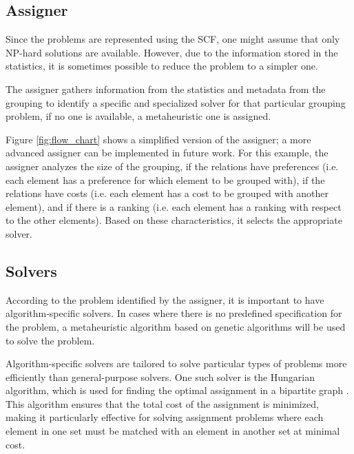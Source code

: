     

    \subsection{Assigner}
        Since the problems are represented using the SCF, one might assume that only NP-hard solutions are available. However, due to the information stored in the statistics, it is sometimes possible to reduce the problem to a simpler one.

        The assigner gathers information from the statistics and metadata from the grouping to identify a specific and specialized solver for that particular grouping problem, if no one is available, a metaheuristic one is assigned.

        Figure \ref{fig:flow_chart} shows a simplified version of the assigner; a more advanced assigner can be implemented in future work.
        For this example, the assigner analyzes the size of the grouping, if the relations have preferences (i.e. each element has a preference for which element to be grouped with), if the relations have costs (i.e. each element has a cost to be grouped with another element), and if there is a ranking (i.e. each element has a ranking with respect to the other elements). Based on these characteristics, it selects the appropriate solver.
        

    \subsection{Solvers}
    
        According to the problem identified by the assigner, it is important to have algorithm-specific solvers. In cases where there is no predefined specification for the problem, a metaheuristic algorithm based on genetic algorithms will be used to solve the problem.

        Algorithm-specific solvers are tailored to solve particular types of problems more efficiently than general-purpose solvers. One such solver is the Hungarian algorithm, which is used for finding the optimal assignment in a bipartite graph \cite{kuhn1955hungarian}. This algorithm ensures that the total cost of the assignment is minimized, making it particularly effective for solving assignment problems where each element in one set must be matched with an element in another set at minimal cost.

